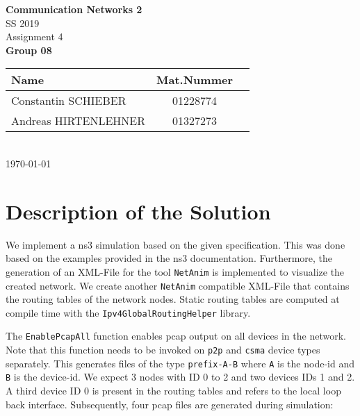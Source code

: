 \documentclass[parskip=full]{scrartcl}
\begin{document}
\begin{titlepage}
    \centering
    \vspace*{2cm}
    {\Huge \textbf{Communication Networks 2}}\\
    SS 2019\\
    \vspace*{1cm}
    {\Large Assignment 4}
    \\\vspace*{3cm}
    {\Large \textbf{Group 08}}\\
    \vspace*{1cm}
    {\large 
        \begin{tabular}{l c c}
            Name & Mat.Nummer \\ \hline
            Constantin SCHIEBER & 01228774 \\
            Andreas HIRTENLEHNER & 01327273
        \end{tabular}
    }
    \\\vspace*{7cm}
    \today
\end{titlepage}


\section{Description of the Solution}
We implement a ns3 simulation based on the given specification.
This was done based on the examples provided in the ns3 documentation.
Furthermore, the generation of an XML-File for the tool \texttt{NetAnim} is implemented to visualize the created network.
We create another \texttt{NetAnim} compatible XML-File that contains the routing tables of the network nodes.
Static routing tables are computed at compile time with the \texttt{Ipv4GlobalRoutingHelper} library.

The \texttt{EnablePcapAll} function enables pcap output on all devices in the network. 
Note that this function needs to be invoked on \texttt{p2p} and \texttt{csma} device types separately.
This generates files of the type \texttt{prefix-A-B} where \texttt{A} is the node-id and \texttt{B} is the device-id. 
We expect 3 nodes with ID 0 to 2 and two devices IDs 1 and 2. 
A third device ID 0 is present in the routing tables and refers to the local loop back interface. 
Subsequently, four pcap files are generated during simulation:
\end{document}
